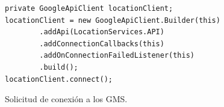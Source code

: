\begin{figure}[h] 
\begin{verbatim}
private GoogleApiClient locationClient;
locationClient = new GoogleApiClient.Builder(this)
        .addApi(LocationServices.API)
        .addConnectionCallbacks(this)
        .addOnConnectionFailedListener(this)
        .build();
locationClient.connect();
\end{verbatim}
\caption{Solicitud de conexión a los GMS.}
\label{code:location}
\end{figure}

\chapterend{}